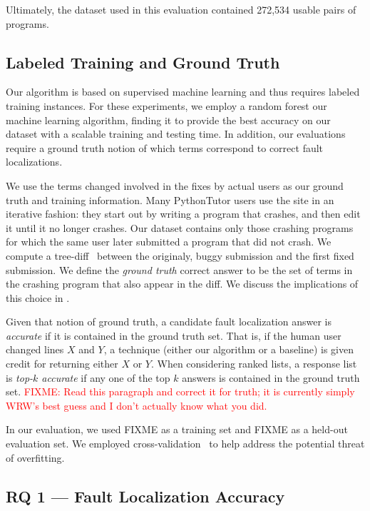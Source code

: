 \documentclass[conference]{IEEEtran}
\newcommand{\fixme}[1]{\textcolor{red}{FIXME: #1}}
\begin{document}
Ultimately, the dataset used in this evaluation contained 
272,534 usable pairs of programs.

\subsection{Labeled Training and Ground Truth}
\label{sec-training} 

Our algorithm is based on supervised machine learning and thus requires
labeled training instances.  For these experiments, we employ a random
forest our machine learning algorithm, finding it to provide the best
accuracy on our dataset with a scalable training and testing time.  In
addition, our evaluations require a ground truth notion of which terms
correspond to correct fault localizations.

We use the terms changed involved in the fixes by actual users as our
ground truth and training information.  Many PythonTutor users use the site
in an iterative fashion: they start out by writing a program that crashes,
and then edit it until it no longer crashes. Our dataset contains only
those crashing programs for which the same user later submitted a program
that did not crash. We compute a tree-diff~\cite{tree-diff} between the
originaly, buggy submission and the first fixed submission. We define
the \emph{ground truth} correct answer to be the set of terms in the
crashing program that also appear in the diff. We discuss the implications
of this choice in .

Given that notion of ground truth, a candidate fault localization answer is
\emph{accurate} if it is contained in the ground truth set. That is, if the
human user changed lines $X$ and $Y$, a technique (either our algorithm 
or a baseline) is given credit for returning either $X$ or $Y$. When
considering ranked lists, a response list is \emph{top-$k$ accurate} if any one
of the top $k$ answers is contained in the ground truth set. \fixme{Read
this paragraph and correct it for truth; it is currently simply WRW's best
guess and I don't actually know what you did.} 

In our evaluation, we used FIXME as a training set and FIXME as a held-out
evaluation set. We employed cross-validation~\cite{kohavi} to help address
the potential threat of overfitting.

\subsection{RQ 1 --- Fault Localization Accuracy}
\end{document}
